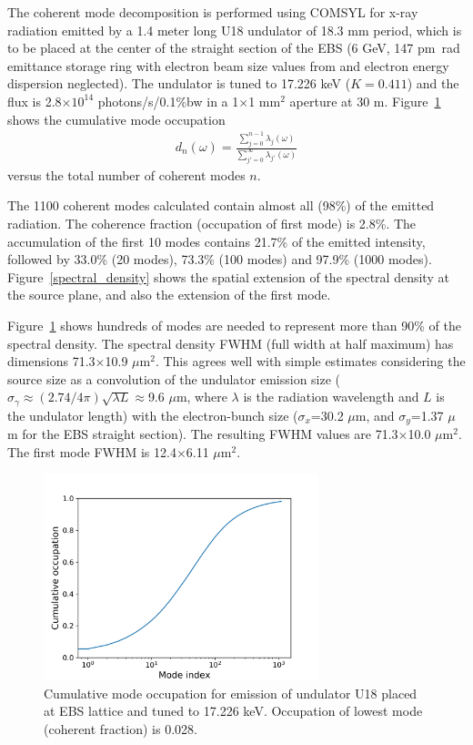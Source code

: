 \documentclass[%
 reprint,
 amsmath,amssymb,
 aps,
]{revtex4-1}
\begin{document}
The coherent mode decomposition {\color{red} is performed using COMSYL for x-ray radiation emitted by a 1.4 meter long U18 undulator of 18.3 mm period, which is to be placed at the center of the straight section of the EBS (6 GeV, 147 pm~rad emittance storage ring with electron beam size values from \cite{orangebook} and electron energy dispersion neglected)}. The undulator is tuned to 17.226 keV ($K=0.411$) and the flux is 2.8$\times 10^{14}$ photons/s/0.1\%bw in a 1$\times$1 mm$^2$ aperture at 30 m. Figure~\ref{cumulative_mode_occupation} shows the cumulative mode occupation 
\begin{equation}
\begin{aligned}
\label{spectrum}
d_n(\omega)=\frac{\sum_{j=0}^{n-1} \lambda_j(\omega)}{\sum_{j'=0}^{\infty} \lambda_{j'}(\omega)}
\end{aligned}
\end{equation}
versus the total number of coherent modes $n$.

The 1100 coherent modes calculated contain almost all (98\%) of the emitted radiation. The coherence fraction (occupation of first mode) is 2.8\%. The accumulation of the first 10 modes contains 21.7\% of the emitted intensity, followed by 33.0\% (20 modes), 73.3\% (100 modes) and 97.9\% (1000 modes). 
Figure~\ref{spectral_density} shows the spatial extension of the spectral density at the source plane, and also the extension of the first mode.

Figure~\ref{cumulative_mode_occupation} shows hundreds of modes are needed to represent more than 90\% of the spectral density. The spectral density FWHM (full width at half maximum) has dimensions 71.3$\times$10.9 $\mu$m$^2$. This agrees well with simple estimates considering the source size as a convolution of the undulator emission size ($\sigma_\gamma\approx (2.74/4\pi) \sqrt{\lambda L}\approx$9.6 $\mu$m, where  $\lambda$ is the radiation wavelength and $L$ is the undulator length) with the electron-bunch size ($\sigma_x$=30.2 $\mu$m, and $\sigma_y$=1.37 $\mu$m for the EBS straight section). The resulting FWHM values are 71.3$\times$10.0 $\mu$m$^2$. The first mode FWHM is 12.4$\times$6.11 $\mu$m$^2$.  

\begin{figure}
\includegraphics[width=8cm]{Figures/vx_cumulated.png}
\caption{Cumulative mode occupation for  emission of undulator U18 placed at EBS lattice and tuned to 17.226 keV. Occupation of lowest mode (coherent fraction) is 0.028.}
\label{cumulative_mode_occupation}
\end{figure}
\end{document}
